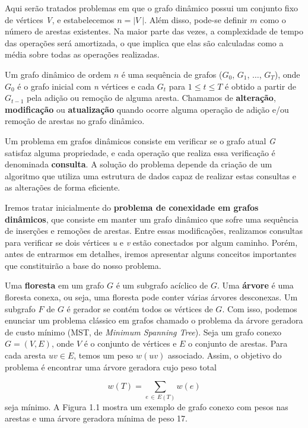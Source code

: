 Aqui serão tratados problemas em que o grafo dinâmico possui um conjunto fixo de vértices \textit{V}, e estabelecemos $n = |\textit{V}\ |$. Além disso, pode-se definir $m$ como o número de arestas existentes. Na maior parte das vezes, a complexidade de tempo das operações será amortizada, o que implica que elas são calculadas como a média sobre todas as operações realizadas. 

Um grafo dinâmico de ordem $n$ é uma sequência de grafos ($G_0$, $G_1$, $\ldots$, $G_T$), onde $G_0$ é o grafo inicial com \textit{n} vértices e cada $G_t$ para $1 \leq t \leq T$ é obtido a partir de $G_{t-1}$ pela adição ou remoção de alguma aresta. Chamamos de \textbf{alteração}, \textbf{modificação} ou \textbf{atualização} quando ocorre alguma operação de adição e/ou remoção de arestas no grafo dinâmico.

Um problema em grafos dinâmicos consiste em verificar se o grafo atual \textit{G} satisfaz alguma propriedade, e cada operação que realiza essa verificação é denominada \textbf{consulta}. A solução do problema depende da criação de um algoritmo que utiliza uma estrutura de dados capaz de realizar estas consultas e as alterações de forma eficiente. 

Iremos tratar inicialmente do \textbf{problema de conexidade em grafos dinâmicos}, que consiste em manter um grafo dinâmico que sofre uma sequência de inserções e remoções de arestas. Entre essas modificações, realizamos consultas para verificar se dois vértices \textit{u} e \textit{v} estão conectados por algum caminho. Porém, antes de entrarmos em detalhes, iremos apresentar alguns conceitos importantes que constituirão a base do nosso problema. 

Uma \textbf{floresta} em um grafo $G$ é um subgrafo acíclico de $G$. Uma \textbf{árvore} é uma floresta conexa, ou seja, uma floresta pode conter várias árvores desconexas. Um subgrafo $F$ de $G$ é gerador se contém todos os vértices de $G$. Com isso, podemos enunciar um problema clássico em grafos chamado o problema da árvore geradora de custo mínimo (MST, de \textit{Minimum Spanning Tree}). Seja um grafo conexo $G = (V, E)$, onde $V$ é o conjunto de vértices e $E$ o conjunto de arestas. Para cada aresta $uv \in E$, temos um peso $w(uv)$ associado. Assim, o objetivo do problema é encontrar uma árvore geradora cujo peso total 

$$
w(T) = \sum_{e \,\in\, E(T)} w(e)
$$
seja mínimo. A Figura 1.1 mostra um exemplo de grafo conexo com pesos nas arestas e uma árvore geradora mínima de peso 17.


